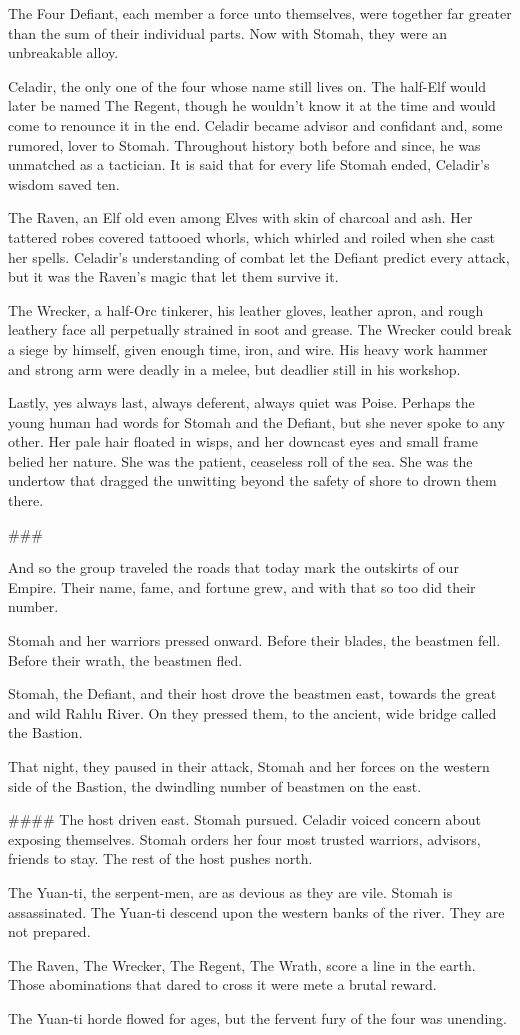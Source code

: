 The Four Defiant, each member a force unto themselves, were together far greater than the sum
  of their individual parts.
Now with Stomah, they were an unbreakable alloy.

Celadir, the only one of the four whose name still lives on.
The half-Elf would later be named The Regent, though he wouldn't know it at the time
  and would come to renounce it in the end.
Celadir became advisor and confidant and, some rumored, lover to Stomah.
Throughout history both before and since, he was unmatched as a tactician.
It is said that for every life Stomah ended, Celadir's wisdom saved ten.

The Raven, an Elf old even among Elves with skin of charcoal and ash.
Her tattered robes covered tattooed whorls, which whirled and roiled when she cast her spells.
Celadir's understanding of combat let the Defiant predict every attack,
  but it was the Raven's magic that let them survive it.

The Wrecker, a half-Orc tinkerer, his leather gloves, leather apron, and rough leathery face all
  perpetually strained in soot and grease.
The Wrecker could break a siege by himself, given enough time, iron, and wire.
His heavy work hammer and strong arm were deadly in a melee, but deadlier still in his workshop.

Lastly, yes always last, always deferent, always quiet was Poise.
Perhaps the young human had words for Stomah and the Defiant, but she never spoke to any other.
Her pale hair floated in wisps, and her downcast eyes and small frame belied her nature.
She was the patient, ceaseless roll of the sea.
She was the undertow that dragged the unwitting beyond the safety of shore to drown them there.

###

And so the group traveled the roads that today mark the outskirts of our Empire.
Their name, fame, and fortune grew, and with that so too did their number.

Stomah and her warriors pressed onward.
Before their blades, the beastmen fell.
Before their wrath, the beastmen fled.

Stomah, the Defiant, and their host drove the beastmen east,
  towards the great and wild Rahlu River.
On they pressed them, to the ancient, wide bridge called the Bastion.

That night, they paused in their attack, Stomah and her forces on the western side of the Bastion,
  the dwindling number of beastmen on the east.



####
The host driven east.
Stomah pursued.
Celadir voiced concern about exposing themselves.
Stomah orders her four most trusted warriors, advisors, friends to stay.
The rest of the host pushes north.

The Yuan-ti, the serpent-men, are as devious as they are vile.
Stomah is assassinated.
The Yuan-ti descend upon the western banks of the river.
They are not prepared.

The Raven, The Wrecker, The Regent, The Wrath, score a line in the earth.
Those abominations that dared to cross it were mete a brutal reward.

The Yuan-ti horde flowed for ages, but the fervent fury of the four was unending.
